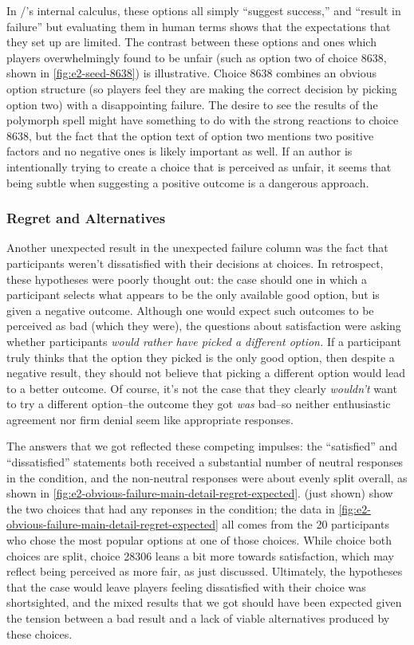 In \dunyazad/'s internal calculus, these options all simply ``suggest success,'' and ``result in failure'' but evaluating them in human terms shows that the expectations that they set up are limited.
%
The contrast between these options and ones which players overwhelmingly found to be unfair (such as option two of choice 8638, shown in \cref{fig:e2-seed-8638}) is illustrative.
%
Choice 8638 combines an obvious option structure (so players feel they are making the correct decision by picking option two) with a disappointing failure.
%
The desire to see the results of the polymorph spell might have something to do with the strong reactions to choice 8638, but the fact that the option text of option two mentions two positive factors and no negative ones is likely important as well.
%
If an author is intentionally trying to create a choice that is perceived as unfair, it seems that being subtle when suggesting a positive outcome is a dangerous approach.


\subsubsection{Regret and Alternatives}

Another unexpected result in the unexpected failure column was the fact that participants weren't dissatisfied with their decisions at \obvf{} choices.
%
In retrospect, these hypotheses were poorly thought out: the \obvfm{} case should one in which a participant selects what appears to be the only available good option, but is given a negative outcome.
%
Although one would expect such outcomes to be perceived as bad (which they were), the questions about satisfaction were asking whether participants \emph{would rather have picked a different option.}
%
If a participant truly thinks that the option they picked is the only good option, then despite a negative result, they should not believe that picking a different option would lead to a better outcome.
%
Of course, it's not the case that they clearly \emph{wouldn't} want to try a different option--the outcome they got \emph{was} bad--so neither enthusiastic agreement nor firm denial seem like appropriate responses.


The answers that we got reflected these competing impulses: the ``satisfied'' and ``dissatisfied'' statements both received a substantial number of neutral responses in the \obvfm{} condition, and the non-neutral responses were about evenly split overall, as shown in \cref{fig:e2-obvious-failure-main-detail-regret-expected}.
%
 (just shown) show the two choices that had any \casem{} reponses in the \obvf{} condition; the data in \cref{fig:e2-obvious-failure-main-detail-regret-expected} all comes from the 20 participants who chose the most popular options at one of those choices.
%
While choice both choices are split, choice 28306 leans a bit more towards satisfaction, which may reflect being perceived as more fair, as just discussed.
%
Ultimately, the hypotheses that the \obvfm{} case would leave players feeling dissatisfied with their choice was shortsighted, and the mixed results that we got should have been expected given the tension between a bad result and a lack of viable alternatives produced by these choices.


